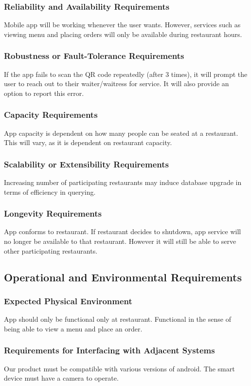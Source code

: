 \documentclass[12pt, titlepage]{article}
\begin{document}
\subsubsection{Reliability and Availability Requirements}
Mobile app will be working whenever the user wants. However, services such as viewing menu and placing orders will only be available during restaurant hours.
\subsubsection{Robustness or Fault-Tolerance Requirements}
If the app fails to scan the QR code repeatedly (after 3 times), it will prompt the user to reach out to their waiter/waitress for service. It will also provide an option to report this error.
\subsubsection{Capacity Requirements}
App capacity is dependent on how many people can be seated at a restaurant. This will vary, as it is dependent on restaurant capacity. 
\subsubsection{Scalability or Extensibility Requirements}
Increasing number of participating restaurants may induce database upgrade in terms of efficiency in querying.   
\subsubsection{Longevity Requirements}
App conforms to restaurant. If restaurant decides to shutdown, app service will no longer be available to that restaurant. However it will still be able to serve other participating restaurants.

\subsection{Operational and Environmental Requirements}
\subsubsection{Expected Physical Environment}
App should only be functional only at restaurant. Functional in the sense of being able to view a menu and place an order.
\subsubsection{Requirements for Interfacing with Adjacent Systems}
Our product must be compatible with various versions of android. The smart device must have a camera to operate. 
\end{document}

